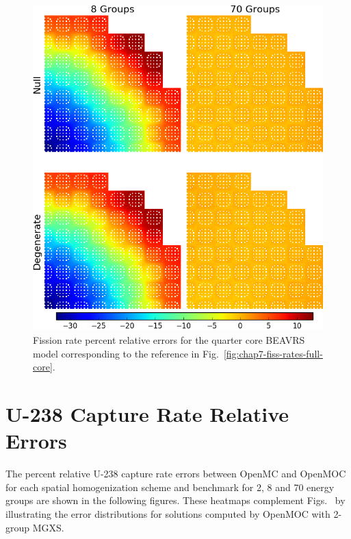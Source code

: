 \begin{appendices}
\begin{figure}[h!]
\centering
\includegraphics[width=\linewidth]{figures/quantification/appendix/full-core/fiss-err}
\vspace{2mm}
\caption[Fission rate errors for BEAVRS]{Fission rate percent relative errors for the quarter core \ac{BEAVRS} model corresponding to the reference in Fig.~\ref{fig:chap7-fiss-rates-full-core}.}
\label{fig:quantify-full-core-fiss-err}
\end{figure}

\clearpage


\section{U-238 Capture Rate Relative Errors}
\label{sec:quantify-capt-rates}

The percent relative U-238 capture rate errors between OpenMC and OpenMOC for each spatial homogenization scheme and benchmark for 2, 8 and 70 energy groups are shown in the following figures. These heatmaps complement Figs.~ by illustrating the error distributions for solutions computed by OpenMOC with 2-group \ac{MGXS}.


\end{appendices}
